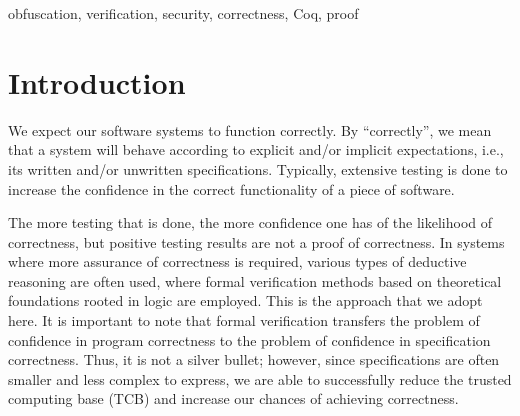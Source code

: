 \documentclass[compsoc,conference,a4paper,10pt,times]{IEEEtran}
\begin{document}
\begin{IEEEkeywords}
obfuscation, verification, security, correctness, Coq, proof
\end{IEEEkeywords}

\section{Introduction}
We expect our software systems to function correctly. By ``correctly'', we mean that a system will behave according to explicit and/or implicit expectations, i.e., its written and/or unwritten specifications. Typically, extensive testing is done to increase the confidence in the correct functionality of a piece of software.

The more testing that is done, the more confidence one has of the likelihood of correctness, but positive testing results are not a proof of correctness.
In systems where more assurance of correctness is required, various types of deductive reasoning are often used, where formal verification methods based on theoretical foundations rooted in logic are employed. This is the approach that we adopt here.  It is important to note that formal verification transfers the problem of confidence in program correctness to the problem of confidence in specification correctness.  Thus, it is not a silver bullet; however, since specifications are often smaller and less complex to express, we are able to successfully reduce the trusted computing base (TCB) and increase our chances of achieving correctness.
\end{document}
